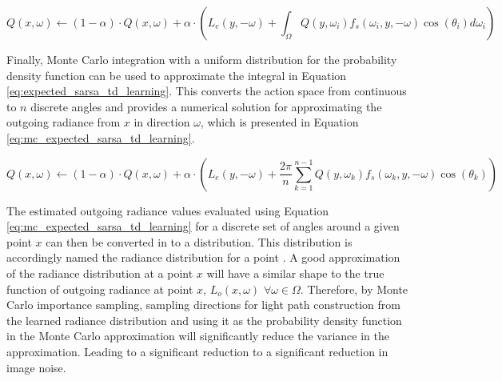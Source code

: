 \documentclass[../dissertation.tex]{subfiles}
\begin{document}
\begin{equation}
Q(x, \omega) \leftarrow (1 - \alpha) \cdot Q(x, \omega) + \alpha \cdot \left( L_e(y, -\omega) + \int_\Omega Q(y, \omega_i) f_s(\omega_i, y, -\omega) \cos(\theta_i) d\omega_i \right)
\label{eq:expected_sarsa_td_learning}
\end{equation}

Finally, Monte Carlo integration with a uniform distribution for the probability density function can be used to approximate the integral in Equation \ref{eq:expected_sarsa_td_learning}. This converts the action space from continuous to $n$ discrete angles and provides a numerical solution for approximating the outgoing radiance from $x$ in direction $\omega$, which is presented in Equation \ref{eq:mc_expected_sarsa_td_learning}.

\begin{equation}
Q(x, \omega) \leftarrow (1 - \alpha) \cdot Q(x, \omega) + \alpha \cdot \left( L_e(y, -\omega) +\frac{2 \pi}{n} \sum_{k=1}^{n-1} Q(y, \omega_k) f_s(\omega_k, y, -\omega) \cos(\theta_k)  \right)
\label{eq:mc_expected_sarsa_td_learning}
\end{equation}

The estimated outgoing radiance values evaluated using Equation \ref{eq:mc_expected_sarsa_td_learning} for a discrete set of angles around a given  point $x$ can then be converted in to a distribution. This distribution is accordingly named the radiance distribution for a point \cite{greger1998irradiance}. A good approximation of the radiance distribution at a point $x$ will have a similar shape to the true function of outgoing radiance at point $x$, $L_o(x, \omega)$ $\forall \omega \in \Omega$. Therefore, by Monte Carlo importance sampling, sampling directions for light path construction from the learned radiance distribution and using it as the probability density function in the Monte Carlo approximation will significantly reduce the variance in the approximation. Leading to a significant reduction to a significant reduction in image noise.
\end{document}
